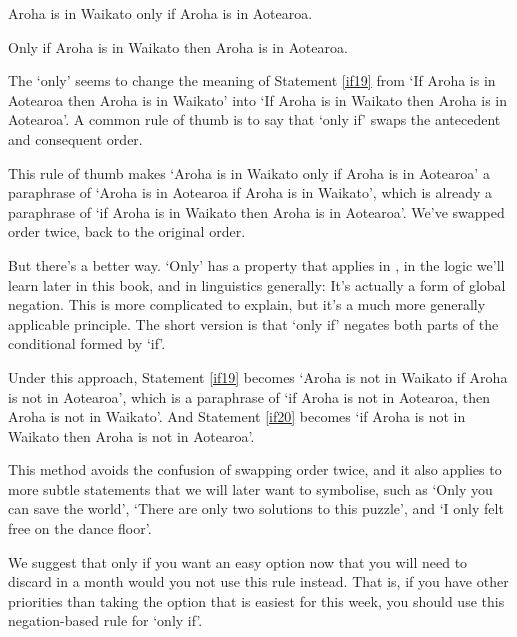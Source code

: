 \documentclass[PHIL101-Textbook.tex]{subfiles}
\begin{document}
	\begin{earg}
		\item[\ex{if19}] Aroha is in Waikato only if Aroha is in Aotearoa.
		\item[\ex{if20}] Only if Aroha is in Waikato then Aroha is in Aotearoa.
	\end{earg}
The `only' seems to change the meaning of Statement \ref{if19} from `If Aroha is in Aotearoa then Aroha is in Waikato' into `If Aroha is in Waikato then Aroha is in Aotearoa'. A common rule of thumb is to say that `only if' swaps the antecedent and consequent order.

This rule of thumb makes `Aroha is in Waikato only if Aroha is in Aotearoa' a paraphrase of `Aroha is in Aotearoa if Aroha is in Waikato', which is already a paraphrase of `if Aroha is in Waikato then Aroha is in Aotearoa'. We've swapped order twice, back to the original order. %


But there's a better way. `Only' has a property that applies in \tfl, in the logic we'll learn later in this book, and in linguistics generally: It's actually a form of global negation. This is more complicated to explain, but it's a much more generally applicable principle. The short version is that `only if' negates both parts of the conditional formed by `if'.

Under this approach, Statement \ref{if19} becomes `Aroha is not in Waikato if Aroha is not in Aotearoa', which is a paraphrase of `if  Aroha is not in Aotearoa, then Aroha is not in Waikato'. And Statement \ref{if20} becomes `if Aroha is not in Waikato then Aroha is not in Aotearoa'.

This method avoids the confusion of swapping order twice, and it also applies to more subtle statements that we will later want to symbolise, such as `Only you can save the world', `There are only two solutions to this puzzle', and `I only felt free on the dance floor'.


We suggest that only if you want an easy option now that you will need to discard in a month would you not use this rule instead. That is, if you have other priorities than taking the option that is easiest for this week, you should use this negation-based rule for `only if'.
\end{document}
